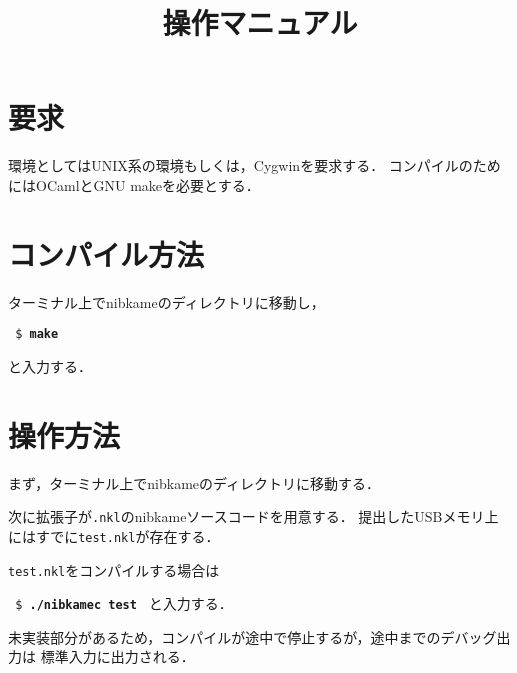 \documentclass[a4paper]{jsarticle}
\title{操作マニュアル}
\date{\relax}
\begin{document}
\maketitle
\section{要求}
環境としてはUNIX系の環境もしくは，Cygwinを要求する．
コンパイルのためにはOCamlとGNU makeを必要とする．

\section{コンパイル方法}
ターミナル上でnibkameのディレクトリに移動し，

{\tt
\$ \textbf{make}
}

と入力する．

\section{操作方法}
まず，ターミナル上でnibkameのディレクトリに移動する．

次に拡張子が\verb|.nkl|のnibkameソースコードを用意する．
提出したUSBメモリ上にはすでに\verb|test.nkl|が存在する．

\verb|test.nkl|をコンパイルする場合は

{\tt
\$ \textbf{./nibkamec\ test}
}
と入力する．

未実装部分があるため，コンパイルが途中で停止するが，途中までのデバッグ出力は
標準入力に出力される．
\end{document}
